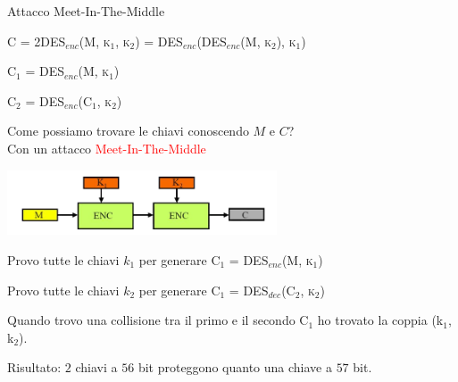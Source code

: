 \documentclass[handout, xcolor=dvipsnames,aspectratio=169]{beamer}
\begin{document}
\begin{frame}{Attacco Meet-In-The-Middle}

\small

  \textsc{C = 2DES$_{enc}$(M, k$_1$, k$_2$) = DES$_{enc}$(DES$_{enc}$(M, k$_2$), k$_1$)}
  
  \medskip
  
  \textsc{C$_1$ = DES$_{enc}$(M, k$_1$)}

  \smallskip
  
  \textsc{C$_2$ = DES$_{enc}$(C$_1$, k$_2$)}

  \medskip
    
  Come possiamo trovare le chiavi conoscendo $M$ e $C$? \\Con un attacco \textcolor{red}{Meet-In-The-Middle}
  
  \begin{center}
    \includegraphics[width=8cm]{img/middle}
  \end{center} 


  Provo tutte le chiavi $k_1$ per generare \textsc{C$_1$ = DES$_{enc}$(M, k$_1$)}
    
  \smallskip
  
  Provo tutte le chiavi $k_2$ per generare \textsc{C$_1$ = DES$_{dec}$(C$_2$, k$_2$)}

  \smallskip
    
  Quando trovo una collisione tra il primo e il secondo C$_1$ ho trovato la coppia (k$_1$, k$_2$).  

  \smallskip

  Risultato: $2$ chiavi a $56$ bit proteggono quanto una chiave a $57$ bit.

\end{frame}
\end{document}
